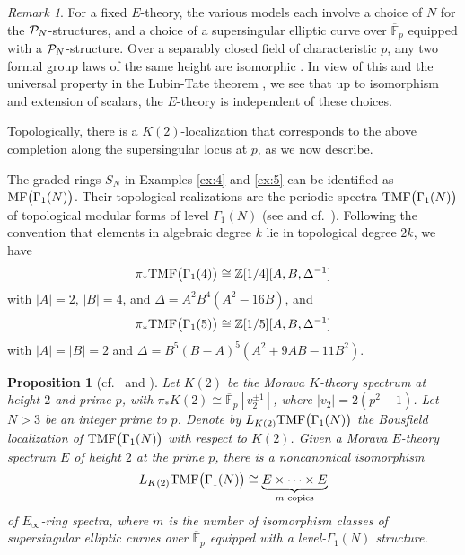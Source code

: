 \documentclass{gtpart}
\newtheorem{prop}[equation]{Proposition}
\theoremstyle{definition}
\theoremstyle{remark}
\newtheorem{rmk}[equation]{Remark}
\newcommand{\mb}[1]{\mathbb{#1}}
\newcommand{\cF}{\overline {\mb F}}
\newcommand{\CP}{{\cal P}}
\newcommand{\BZ}{{\mb Z}}
\newcommand{\TMF}{{\rm TMF}}
\newcommand{\MF}{{\rm MF}}
\renewcommand{\D}{\Delta}
\newcommand{\G}{\Gamma}
\renewcommand{\=}{\approx}
\renewcommand{\-}{\sim}
\numberwithin{equation}{section}
\begin{document}
\begin{rmk}
 \label{rmk:N}
 For a fixed $E$-theory, the various models each involve a choice of $N$ for the 
 $\CP_N$-structures, and a choice of a supersingular elliptic curve over $\cF_p$ 
 equipped with a $\CP_N$-structure.  Over a separably closed field of 
 characteristic $p$, any two formal group laws of the same height are isomorphic 
 \cite[Th\'eor\`eme IV]{Lazard}.  In view of this and the universal property in 
 the Lubin-Tate theorem \cite[Theorem 3.1]{LT}, we see that up to isomorphism 
 and extension of scalars, the $E$-theory is independent of these choices.  
\end{rmk}

Topologically, there is a $K(2)$-localization that corresponds to the above 
completion along the supersingular locus at $p$, as we now describe.  

The graded rings $S_N$ in Examples \ref{ex:4} and \ref{ex:5} can be identified 
as $\MF\big(\G_1(N)\big)$.  Their topological realizations are the periodic 
spectra $\TMF\big(\G_1(N)\big)$ of topological modular forms of level $\G_1(N)$ 
(see \cite[Section 2]{tmf3} and cf.~\cite{logetaletmf}).  Following the 
convention that elements in algebraic degree $k$ lie in topological degree 
$2 k$, we have 
\[
 \pi_* \TMF\big(\G_1(4)\big) \cong \BZ[1/4][A, B, \D^{-1}] 
\]
with $|A| = 2$, $|B| = 4$, and $\D = A^2 B^4 (A^2 - 16 B)$, and 
\[
 \pi_* \TMF\big(\G_1(5)\big) \cong \BZ[1/5][A, B, \D^{-1}] 
\]
with $|A| = |B| = 2$ and $\D = B^5 (B - A)^5 (A^2 + 9 A B - 11 B^2)$.  

\begin{prop}[{cf.~\cite[Section 3.5]{BOSS} and 
\cite[Corollary on page 20]{Tnf}}]
 \label{prop:tmfe}
 Let $K(2)$ be the Morava $K$-theory spectrum at height $2$ and prime $p$, with 
 $\pi_* K(2) \cong \cF_p [v_2^{\pm 1}]$, where $|v_2| = 2 (p^2 - 1)$.  Let 
 $N > 3$ be an integer prime to $p$.  Denote by $L_{K(2)} \TMF\big(\G_1(N)\big)$ 
 the Bousfield localization of $\TMF\big(\G_1(N)\big)$ with respect to $K(2)$.  
 Given a Morava $E$-theory spectrum $E$ of height $2$ at the prime $p$, there is 
 a noncanonical isomorphism 
 \[
  L_{K(2)} \TMF\big(\G_1(N)\big) \cong 
  \underbrace{E \times \cdots \times E}_\text{$m$ copies} 
 \]
 of $E_\infty$-ring spectra, where $m$ is the number of isomorphism classes of 
 supersingular elliptic curves over $\cF_p$ equipped with a level-$\G_1(N)$ 
 structure.  
\end{prop}
\end{document}
